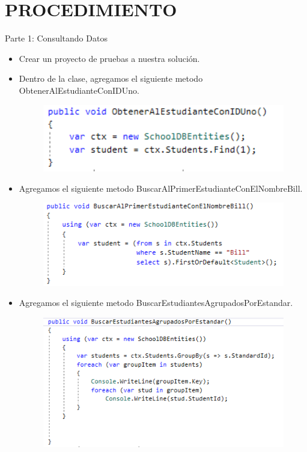 \section{PROCEDIMIENTO} 

Parte 1: Consultando Datos
\begin{itemize}
	\item Crear un proyecto de pruebas a nuestra solución.
	\item Dentro de la clase, agregamos el siguiente metodo ObtenerAlEstudianteConIDUno.
	\begin{figure}[htb]
\begin{center}
\includegraphics[width=12cm]{./Imagenes/1-1}
\end{center}
\end{figure}
	\item Agregamos el siguiente metodo BuscarAlPrimerEstudianteConElNombreBill.
\begin{figure}[htb]
\begin{center}
\includegraphics[width=12cm]{./Imagenes/1-2}
\end{center}
\end{figure}
	\item Agregamos el siguiente metodo BuscarEstudiantesAgrupadosPorEstandar.
\begin{figure}[htb]
\begin{center}
\includegraphics[width=12cm]{./Imagenes/1-3}

\end{center}
\end{figure}
\end{itemize}
